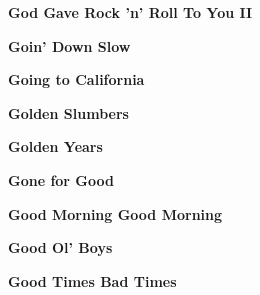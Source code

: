 \newline
\vspace{10pt} 
\begin{center}\textbf{God Gave Rock 'n' Roll To You II}\end{center}
\newline
\vspace{10pt} 
\begin{center}\textbf{Goin' Down Slow}\end{center}
\newline
\vspace{10pt} 
\begin{center}\textbf{Going to California}\end{center}
\newline
\vspace{10pt} 
\begin{center}\textbf{Golden Slumbers}\end{center}
\newline
\vspace{10pt} 
\begin{center}\textbf{Golden Years}\end{center}
\newline
\vspace{10pt} 
\begin{center}\textbf{Gone for Good}\end{center}
\newline
\vspace{10pt} 
\begin{center}\textbf{Good Morning Good Morning}\end{center}
\newline
\vspace{10pt} 
\begin{center}\textbf{Good Ol' Boys}\end{center}
\newline
\vspace{10pt} 
\begin{center}\textbf{Good Times Bad Times}\end{center}
\newline
